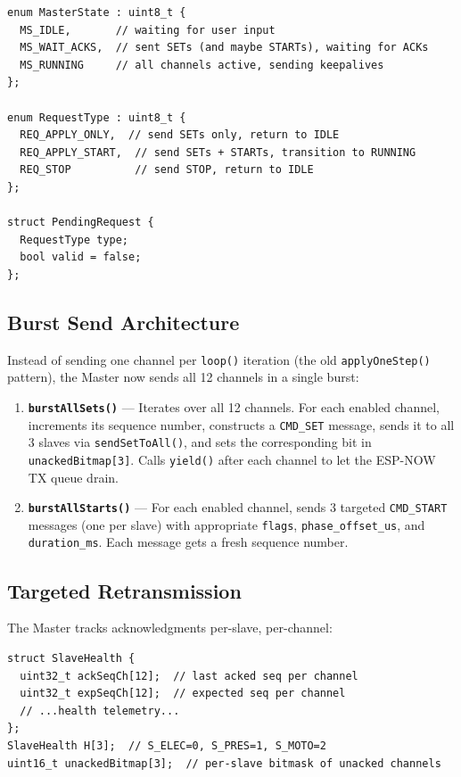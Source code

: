 \documentclass[11pt,a4paper]{article}
\begin{document}
\begin{lstlisting}[style=cppstyle, caption={Master state types}]
enum MasterState : uint8_t {
  MS_IDLE,       // waiting for user input
  MS_WAIT_ACKS,  // sent SETs (and maybe STARTs), waiting for ACKs
  MS_RUNNING     // all channels active, sending keepalives
};

enum RequestType : uint8_t {
  REQ_APPLY_ONLY,  // send SETs only, return to IDLE
  REQ_APPLY_START,  // send SETs + STARTs, transition to RUNNING
  REQ_STOP          // send STOP, return to IDLE
};

struct PendingRequest {
  RequestType type;
  bool valid = false;
};
\end{lstlisting}

\subsection{Burst Send Architecture}

Instead of sending one channel per \texttt{loop()} iteration (the old
\texttt{applyOneStep()} pattern), the Master now sends all 12 channels in a
single burst:

\begin{enumerate}
  \item \textbf{\texttt{burstAllSets()}} --- Iterates over all 12 channels. For each enabled channel, increments its sequence number, constructs a \texttt{CMD\_SET} message, sends it to all 3 slaves via \texttt{sendSetToAll()}, and sets the corresponding bit in \texttt{unackedBitmap[3]}. Calls \texttt{yield()} after each channel to let the ESP-NOW TX queue drain.

  \item \textbf{\texttt{burstAllStarts()}} --- For each enabled channel, sends 3 targeted \texttt{CMD\_START} messages (one per slave) with appropriate \texttt{flags}, \texttt{phase\_offset\_us}, and \texttt{duration\_ms}. Each message gets a fresh sequence number.
\end{enumerate}

\subsection{Targeted Retransmission}

The Master tracks acknowledgments per-slave, per-channel:

\begin{lstlisting}[style=cppstyle]
struct SlaveHealth {
  uint32_t ackSeqCh[12];  // last acked seq per channel
  uint32_t expSeqCh[12];  // expected seq per channel
  // ...health telemetry...
};
SlaveHealth H[3];  // S_ELEC=0, S_PRES=1, S_MOTO=2
uint16_t unackedBitmap[3];  // per-slave bitmask of unacked channels
\end{lstlisting}
\end{document}
